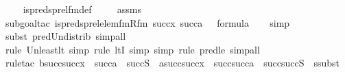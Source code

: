 \begin{isabellebody}
%
\isadelimproof
\ \ %
\endisadelimproof
%
\isatagproof
{}\isamarkupfalse%
\ is{\isacharunderscore}{\kern0pt}preds{\isacharunderscore}{\kern0pt}prel{\isacharunderscore}{\kern0pt}fm{\isacharunderscore}{\kern0pt}def\ \isanewline
\ \ \isamarkupfalse%
\ assms\ \isanewline
\ \ \isamarkupfalse%
{\isacharparenleft}{\kern0pt}subgoal{\isacharunderscore}{\kern0pt}tac\ {\isachardoublequoteopen}is{\isacharunderscore}{\kern0pt}preds{\isacharunderscore}{\kern0pt}prel{\isacharunderscore}{\kern0pt}elem{\isacharunderscore}{\kern0pt}fm{\isacharparenleft}{\kern0pt}Rfm{\isacharcomma}{\kern0pt}\ succ{\isacharparenleft}{\kern0pt}x{\isacharparenright}{\kern0pt}{\isacharcomma}{\kern0pt}\ succ{\isacharparenleft}{\kern0pt}a{\isacharparenright}{\kern0pt}{\isacharcomma}{\kern0pt}\ {}{\isacharparenright}{\kern0pt}\ {\isasymin}\ formula{\isachardoublequoteclose}{\isacharparenright}{\kern0pt}\isanewline
\ \ \isamarkupfalse%
\ simp\ \isanewline
\ \ \ \isamarkupfalse%
{\isacharparenleft}{\kern0pt}subst\ pred{\isacharunderscore}{\kern0pt}Un{\isacharunderscore}{\kern0pt}distrib{\isacharcomma}{\kern0pt}\ simp{\isacharunderscore}{\kern0pt}all{\isacharparenright}{\kern0pt}{\isacharplus}{\kern0pt}\isanewline
\ \ \ \isamarkupfalse%
{\isacharparenleft}{\kern0pt}rule\ Un{\isacharunderscore}{\kern0pt}least{\isacharunderscore}{\kern0pt}lt{\isacharcomma}{\kern0pt}\ simp{\isacharcomma}{\kern0pt}\ rule\ ltI{\isacharcomma}{\kern0pt}\ simp{\isacharcomma}{\kern0pt}\ simp{\isacharcomma}{\kern0pt}\ rule\ pred{\isacharunderscore}{\kern0pt}le{\isacharcomma}{\kern0pt}\ simp{\isacharunderscore}{\kern0pt}all{\isacharparenright}{\kern0pt}\isanewline
\ \ \ \isamarkupfalse%
{\isacharparenleft}{\kern0pt}rule{\isacharunderscore}{\kern0pt}tac\ b{\isacharequal}{\kern0pt}{\isachardoublequoteopen}succ{\isacharparenleft}{\kern0pt}succ{\isacharparenleft}{\kern0pt}x{\isacharparenright}{\kern0pt}\ {\isasymunion}\ succ{\isacharparenleft}{\kern0pt}a{\isacharparenright}{\kern0pt}\ {\isasymunion}\ succ{\isacharparenleft}{\kern0pt}S{\isacharparenright}{\kern0pt}{\isacharparenright}{\kern0pt}{\isachardoublequoteclose}\ \ a{\isacharequal}{\kern0pt}{\isachardoublequoteopen}succ{\isacharparenleft}{\kern0pt}succ{\isacharparenleft}{\kern0pt}x{\isacharparenright}{\kern0pt}{\isacharparenright}{\kern0pt}\ {\isasymunion}\ succ{\isacharparenleft}{\kern0pt}succ{\isacharparenleft}{\kern0pt}a{\isacharparenright}{\kern0pt}{\isacharparenright}{\kern0pt}\ {\isasymunion}\ succ{\isacharparenleft}{\kern0pt}succ{\isacharparenleft}{\kern0pt}S{\isacharparenright}{\kern0pt}{\isacharparenright}{\kern0pt}{\isachardoublequoteclose}\ \ ssubst{\isacharparenright}{\kern0pt}\isanewline

\end{isabellebody}
